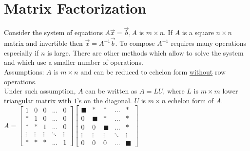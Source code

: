 \documentclass[a4paper,12pt,openany]{book}
\theoremstyle{defn}
\theoremstyle{expl}
\begin{document}
\section{Matrix Factorization}
\noindent Consider the system of equations $A\vec{x}=\vec{b}, A$ is $m\times n$. If $A$ is a square $n\times n$ matrix and invertible then $\vec{x}=A^{-1}\vec{b}$. To compose $A^{-1}$ requires many operations especially if $n$ is large. There are other methods which allow to solve the system and which use a smaller number of operations.\\
Assumptions: $A$ is $m\times n$ and can be reduced to echelon form \underline{without} row operations.\\
Under such assumption, $A$ can be written as $A=LU$, where $L$ is $m\times m$ lower triangular matrix with $1$'s on the diagonal. $U$ is $m\times n$ echelon form of $A$.\\
$A=\left[\begin{array}{ccccc}
1&0&0&...&0\\
*&1&0&...&0\\
*&*&1&...&0\\
\vdots&\vdots&\vdots&\ddots&\vdots\\
*&*&*&...&1\end{array}\right]\left[\begin{array}{ccccc}
\blacksquare&*&*&...&*\\
0&\blacksquare&*&...&*\\
0&0&\blacksquare&...&*\\
\vdots&\vdots&\vdots&\ddots&\vdots\\
0&0&0&...&\blacksquare
\end{array}\right]$
\end{document}
